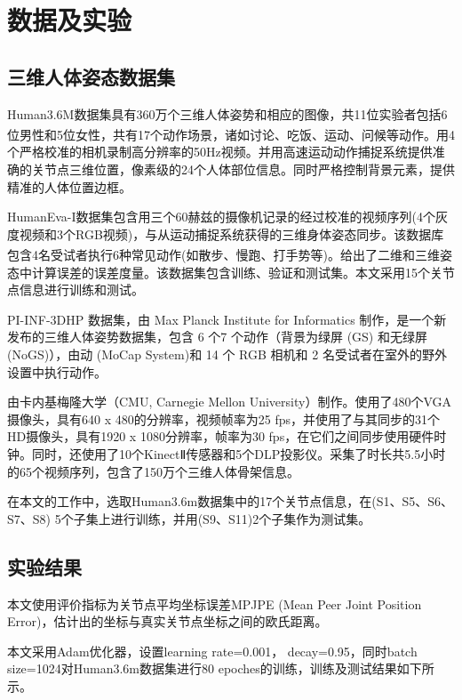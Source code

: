 \section{数据及实验}
\subsection{三维人体姿态数据集}{}
Human3.6M数据集具有360万个三维人体姿势和相应的图像，共11位实验者包括6位男性和5位女性\textsuperscript{\cite{p16}}，共有17个动作场景，诸如讨论、吃饭、运动、问候等动作。用4个严格校准的相机录制高分辨率的50Hz视频。并用高速运动动作捕捉系统提供准确的关节点三维位置，像素级的24个人体部位信息。同时严格控制背景元素，提供精准的人体位置边框。

HumanEva-I数据集包含用三个60赫兹的摄像机记录的经过校准的视频序列(4个灰度视频和3个RGB视频)，与从运动捕捉系统获得的三维身体姿态同步。该数据库包含4名受试者执行6种常见动作(如散步、慢跑、打手势等)\textsuperscript{\cite{p15}}。给出了二维和三维姿态中计算误差的误差度量。该数据集包含训练、验证和测试集。本文采用15个关节点信息进行训练和测试。

PI-INF-3DHP 数据集，由 Max Planck Institute for Informatics 制作，是一个新发布的三维人体姿势数据集，包含 6 个7 个动作（背景为绿屏 (GS) 和无绿屏 (NoGS)），由动 (MoCap System)和 14 个 RGB 相机和 2 名受试者在室外的野外设置中执行动作。

由卡内基梅隆大学（CMU, Carnegie Mellon University）制作。使用了480个VGA摄像头，具有640 x 480的分辨率，视频帧率为25 fps，并使用了与其同步的31个HD摄像头，具有1920 x 1080分辨率，帧率为30 fps，在它们之间同步使用硬件时钟。同时，还使用了10个KinectⅡ传感器和5个DLP投影仪。采集了时长共5.5小时的65个视频序列，包含了150万个三维人体骨架信息。

在本文的工作中，选取Human3.6m数据集中的17个关节点信息，在(S1、S5、S6、S7、S8) 5个子集上进行训练，并用(S9、S11)2个子集作为测试集。

\subsection{实验结果}{}
本文使用评价指标为关节点平均坐标误差MPJPE (Mean Peer Joint Position Error)，估计出的坐标与真实关节点坐标之间的欧氏距离。

本文采用Adam优化器，设置learning rate=0.001， decay=0.95，同时batch size=1024对Human3.6m数据集进行80 epoches的训练，训练及测试结果如下所示。

